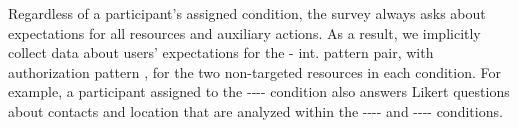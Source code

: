 



Regardless of a participant's assigned condition, the survey always
asks about expectations for all resources and auxiliary actions.
As a result, we implicitly collect data about users' expectations for the
\backgroundonly{}-\backgroundonly{} int. pattern pair, with authorization pattern \never{}, for the two non-targeted 
resources in each condition. For example, a participant assigned to the \coffee{}-\mic{}-\first{}-\interactive{}-\interactive{} 
condition also answers Likert questions about contacts and location that are analyzed within the 
\coffee{}-\contacts{}-\never{}-\backgroundonly{}-\backgroundonly{} and \coffee-\location{}-\never{}-\backgroundonly{}-\backgroundonly{} 
conditions. 

